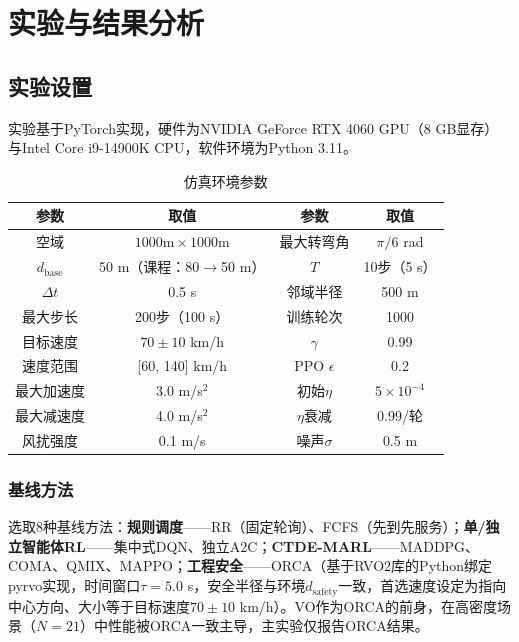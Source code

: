 \documentclass[12pt,a4paper,UTF8]{ctexart}
\begin{document}
\section{实验与结果分析}

\subsection{实验设置}

实验基于PyTorch实现，硬件为NVIDIA GeForce RTX 4060 GPU（8 GB显存）与Intel Core i9-14900K CPU，软件环境为Python 3.11。

\begin{table}[H]
    \centering\small
    \caption{仿真环境参数}
    \label{tab:env}
    \begin{tabular}{|c|c|c|c|}
        \hline
        \textbf{参数} & \textbf{取值} & \textbf{参数} & \textbf{取值} \\
        \hline
        空域 & $1000\text{m}\times1000\text{m}$ & 最大转弯角 & $\pi/6$ rad \\
        $d_{\text{base}}$ & 50 m（课程：80$\to$50 m） & $T$ & 10步（5 s） \\
        $\Delta t$ & 0.5 s & 邻域半径 & 500 m \\
        最大步长 & 200步（100 s） & 训练轮次 & 1000 \\
        目标速度 & $70\pm10$ km/h & $\gamma$ & 0.99 \\
        速度范围 & [60, 140] km/h & PPO $\epsilon$ & 0.2 \\
        最大加速度 & 3.0 m/s$^2$ & 初始$\eta$ & $5\times10^{-4}$ \\
        最大减速度 & 4.0 m/s$^2$ & $\eta$衰减 & 0.99/轮 \\
        风扰强度 & 0.1 m/s & 噪声$\sigma$ & 0.5 m \\
        \hline
    \end{tabular}
\end{table}

\subsubsection{基线方法}

选取8种基线方法：\textbf{规则调度}——RR（固定轮询）、FCFS（先到先服务）；\textbf{单/独立智能体RL}——集中式DQN、独立A2C；\textbf{CTDE-MARL}——MADDPG、COMA、QMIX、MAPPO；\textbf{工程安全}——ORCA\cite{ref4}（基于RVO2库的Python绑定pyrvo实现，时间窗口$\tau=5.0$ s，安全半径与环境$d_{\text{safety}}$一致，首选速度设定为指向中心方向、大小等于目标速度$70\pm10$ km/h）。VO作为ORCA的前身，在高密度场景（$N=21$）中性能被ORCA一致主导，主实验仅报告ORCA结果。
\end{document}
